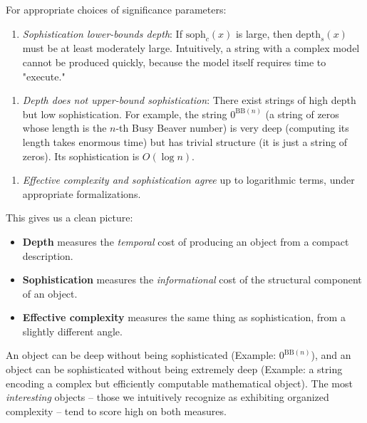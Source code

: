 \begin{theorem}
For appropriate choices of significance parameters:
\end{theorem}

\begin{enumerate}
  \item \textit{Sophistication lower-bounds depth}: If $\text{soph}_c(x)$ is large, then $\text{depth}_s(x)$ must be at least moderately large. Intuitively, a string with a complex model cannot be produced quickly, because the model itself requires time to "execute."
\end{enumerate}

\begin{enumerate}
  \item \textit{Depth does not upper-bound sophistication}: There exist strings of high depth but low sophistication. For example, the string $0^{\text{BB}(n)}$ (a string of zeros whose length is the $n$-th Busy Beaver number) is very deep (computing its length takes enormous time) but has trivial structure (it is just a string of zeros). Its sophistication is $O(\log n)$.
\end{enumerate}

\begin{enumerate}
  \item \textit{Effective complexity and sophistication agree} up to logarithmic terms, under appropriate formalizations.
\end{enumerate}

This gives us a clean picture:

\begin{itemize}
  \item \textbf{Depth} measures the \textit{temporal} cost of producing an object from a compact description.
  \item \textbf{Sophistication} measures the \textit{informational} cost of the structural component of an object.
  \item \textbf{Effective complexity} measures the same thing as sophistication, from a slightly different angle.
\end{itemize}

An object can be deep without being sophisticated (Example: $0^{\text{BB}(n)}$), and an object can be sophisticated without being extremely deep (Example: a string encoding a complex but efficiently computable mathematical object). The most \textit{interesting} objects -- those we intuitively recognize as exhibiting organized complexity -- tend to score high on both measures.

